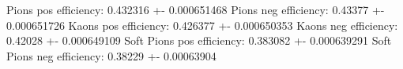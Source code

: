 Pions pos efficiency: 0.432316 +- 0.000651468
Pions neg efficiency: 0.43377 +- 0.000651726
Kaons pos efficiency: 0.426377 +- 0.000650353
Kaons neg efficiency: 0.42028 +- 0.000649109
Soft Pions pos efficiency: 0.383082 +- 0.000639291
Soft Pions neg efficiency: 0.38229 +- 0.00063904